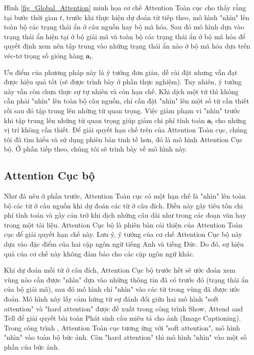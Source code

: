 Hình \ref{fig_Global_Attention} minh họa cơ chế Attention Toàn cục cho thấy rằng tại bước thời gian $t$, trước khi thực hiện dự đoán từ tiếp theo, mô hình "nhìn" lên toàn bộ các trạng thái ẩn ở câu nguồn hay bộ mã hóa. Sau đó mô hình dựa vào trạng thái ẩn hiện tại ở bộ giải mã và toàn bộ các trạng thái ẩn ở bộ mã hóa để quyết định xem nên tập trung vào những trạng thái ẩn nào ở bộ mã hóa dựa trên véc-tơ trọng số gióng hàng $\bm{a}_t$.

Ưu điểm của phương pháp này là ý tưởng đơn giản, dễ cài đặt nhưng vẫn đạt được hiệu quả tốt (sẽ được trình bày ở phần thực nghiệm). Tuy nhiên, ý tưởng này vẫn còn chưa thực sự tự nhiên và còn hạn chế. Khi dịch một từ thì không cần phải "nhìn" lên toàn bộ câu nguồn, chỉ cần đặt "nhìn" lên một số từ cần thiết rồi sau đó tập trung lên những từ quan trọng. Việc giảm phạm vi "nhìn" trước khi tập trung lên những từ quan trọng giúp giảm chi phí tính toán $\bm{a}_t$ cho những vị trí không cần thiết. 
Để giải quyết hạn chế trên của Attention Toàn cục, chúng tôi đã tìm hiểu và sử dụng phiên bản tinh tế hơn, đó là mô hình Attention Cục bộ. Ở phần tiếp theo, chúng tôi sẽ trình bày về mô hình này.

\subsection{Attention Cục bộ}
Như đã nêu ở phần trước, Attention Toàn cục có một hạn chế là "nhìn" lên toàn bộ các từ ở câu nguồn khi dự đoán các từ ở câu đích. Điều này gây tiêu tốn chi phí tính toán và gây cản trở khi dịch những câu dài như trong các đoạn văn hay trong một tài liệu. Attention Cục bộ là phiên bản cải thiện của Attention Toàn cục để giải quyết hạn chế này. Lưu ý, ý tưởng của cơ chế Attention Cục bộ này dựa vào đặc điểm của hai cặp ngôn ngữ tiếng Anh và tiếng Đức. Do đó, sự hiệu quả của cơ chế này không đảm bảo cho các cặp ngôn ngữ khác.

Khi dự đoán mỗi từ ở câu đích, Attention Cục bộ trước hết sẽ ước đoán xem vùng nào cần được "nhìn" dựa vào những thông tin đã có trước đó (trạng thái ẩn của bộ giải mã), sau đó mô hình chỉ "nhìn" vào các từ trong vùng đã được ước đoán. Mô hình này lấy cảm hứng từ sự đánh đổi giữa hai mô hình "soft attention" và "hard attention" được đề xuất trong công trình Show, Attend and Tell \cite{showattendandtellXu2015} để giải quyết bài toán Phát sinh câu miêu tả cho ảnh (Image Captioning). Trong công trình \cite{showattendandtellXu2015}, Attention Toàn cục tương ứng với "soft attention", mô hình "nhìn" vào toàn bộ bức ảnh. Còn "hard attention" thì mô hình "nhìn" vào một số phần của bức ảnh.


